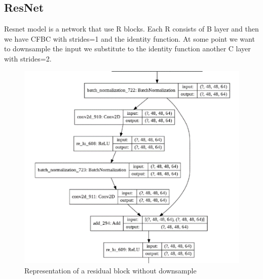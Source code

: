 \documentclass[10pt,twocolumn,letterpaper]{article}
\begin{document}
\subsection*{ResNet}
Resnet model is a network that use R blocks. 
Each R consists of B layer and then we have CFBC with strides=1 and the identity function. 
At some point we want to downsample the input we substitute to the identity function another 
C layer with strides=2.
\begin{figure}[H]
   \includegraphics[width=0.8\linewidth]{./immagini/residual_normal.png}
   \caption{Representation of a residual block without downsample}
\end{figure}
\end{document}
